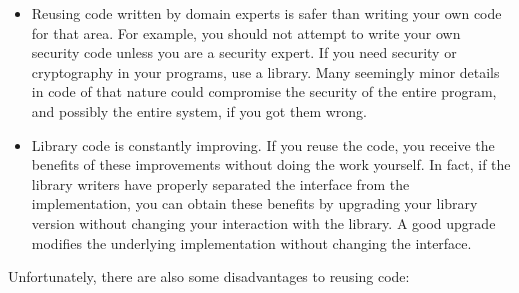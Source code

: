 \begin{itemize}
\item
Reusing code written by domain experts is safer than writing your own code for that area. For example, you should not attempt to write your own security code unless you are a security expert. If you need security or cryptography in your programs, use a library. Many seemingly minor details in code of that nature could compromise the security of the entire program, and possibly the entire system, if you got them wrong.

\item
Library code is constantly improving. If you reuse the code, you receive the benefits of these improvements without doing the work yourself. In fact, if the library writers have properly separated the interface from the implementation, you can obtain these benefits by upgrading your library version without changing your interaction with the library. A good upgrade modifies the underlying implementation without changing the interface.
\end{itemize}


Unfortunately, there are also some disadvantages to reusing code:

